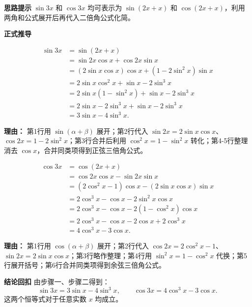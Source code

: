 \begin{proofbox}
	\textbf{\textcolor{CProof}{思路提示}}
	$\sin 3x$ 和 $\cos 3x$ 均可表示为 $\sin(2x+x)$ 和 $\cos(2x+x)$，利用两角和公式展开后再代入二倍角公式化简。

	\medskip
	\textbf{\textcolor{CProof}{正式推导}}
	\begin{description}[style=nextline, leftmargin=2.8em, labelsep=0.5em, itemsep=0.55em]
		\item[\textbf{步骤一（正弦三倍角）：}]
			\[
				\begin{aligned}
					\sin 3x &= \sin(2x+x) \\ &= \sin2x\cos x + \cos2x\sin x \\ &= (2\sin x\cos x)\cos x + (1-2\sin^2 x)\sin x \\ &= 2\sin x\cos^2 x + \sin x - 2\sin^3 x \\ &= 2\sin x(1-\sin^2 x) + \sin x - 2\sin^3 x \\ &= 2\sin x - 2\sin^3 x + \sin x - 2\sin^3 x \\ &= 3\sin x - 4\sin^3 x.
			\end{aligned}
			\]
			\par\textbf{理由：} 第1行用 $\sin(\alpha+\beta)$ 展开；第2行代入 $\sin2x=2\sin x\cos x$、$\cos2x=1-2\sin^2 x$；第3行合并后利用 $\cos^2 x=1-\sin^2 x$ 转化；第4-5行整理消去 $\cos x$，合并同类项得到正弦三倍角公式。
		\item[\textbf{步骤二（余弦三倍角）：}]
			\[
				\begin{aligned}
					\cos 3x &= \cos(2x+x) \\ &= \cos2x\cos x - \sin2x\sin x \\ &= (2\cos^2 x-1)\cos x - (2\sin x\cos x)\sin x \\ &= 2\cos^3 x - \cos x - 2\sin^2 x\cos x \\ &= 2\cos^3 x - \cos x - 2(1-\cos^2 x)\cos x \\ &= 2\cos^3 x - \cos x - 2\cos x + 2\cos^3 x \\ &= 4\cos^3 x - 3\cos x.
			\end{aligned}
			\]
			\par\textbf{理由：} 第1行用 $\cos(\alpha+\beta)$ 展开；第2行代入 $\cos2x=2\cos^2 x-1$、$\sin2x=2\sin x\cos x$；第3行略作整理；第4行用 $\sin^2 x=1-\cos^2 x$ 代换；第5行展开括号；第6行合并同类项得到余弦三倍角公式。
	\end{description}

	\medskip
	\textbf{\textcolor{CProof}{结论回扣}}
	由步骤一、步骤二得到：
	\[
		\boxed{\sin 3x = 3\sin x - 4\sin^3 x},
		\qquad
		\boxed{\cos 3x = 4\cos^3 x - 3\cos x}.
	\]
	这两个恒等式对于任意实数 $x$ 均成立。
\end{proofbox}
